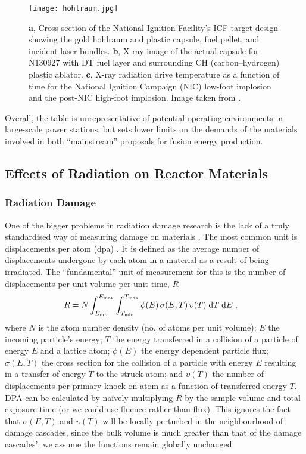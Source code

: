 \begin{figure}[t]
	\centering
	\texttt{[image: hohlraum.jpg]}
	\caption[Hohlraum design for indirect drive in Inertial Confinement Fusion.]{\textbf{a}, Cross section of the National Ignition Facility's ICF target design showing the gold hohlraum and plastic capsule, fuel pellet, and incident laser bundles. \textbf{b}, X-ray image of the actual capsule for N130927 with DT fuel layer and surrounding CH (carbon–hydrogen) plastic ablator. \textbf{c}, X-ray radiation drive temperature as a function of time for the National Ignition Campaign (NIC) low-foot implosion and the post-NIC high-foot implosion. Image taken from \cite{hohlraum}.}
	\label{fig:hohlraum}
\end{figure}

Overall, the table is unrepresentative of potential operating environments in large-scale power stations, but sets lower limits on the demands of the materials involved in both ``mainstream'' proposals for fusion energy production.

\subsection{Effects of Radiation on Reactor Materials}
\label{ss:rad_effect_mat}
\subsubsection{Radiation Damage}
\label{sss:rad_damage}
One of the bigger problems in radiation damage research is the lack of a truly standardised way of measuring damage on materials \cite{srimisbad}. The most common unit is displacements per atom (dpa) \cite{dpa}. It is defined as the average number of displacements undergone by each atom in a material as a result of being irradiated. The ``fundamental'' unit of measurement for this is the number of displacements per unit volume per unit time, $R$
\begin{align}
	R & = N\int _{E_{\textrm{min}}}^{E_{\textrm{max}}}\int _{T_{\textrm{min}}}^{T_{\textrm{max}}}\phi (E)\,\sigma (E,T)\,\upsilon (T)\;\textrm{d}T\;\textrm{d}E\;,
\end{align}
where $ N $ is the atom number density (no. of atoms per unit volume); $ E $ the incoming particle's energy; $ T $ the energy transferred in a collision of a particle of energy $E$ and a lattice atom; $ \phi(E) $ the energy dependent particle flux; $ \sigma(E,T) $ the cross section for the collision of a particle with energy $ E $ resulting in a transfer of energy $ T $ to the struck atom; and $ \upsilon(T) $ the number of displacements per primary knock on atom as a function of transferred energy $ T $. DPA can be calculated by na\"{i}vely multiplying $ R $ by the sample volume and total exposure time (or we could use fluence rather than flux). This ignores the fact that $\sigma (E,T)$ and $\upsilon (T)$ will be locally perturbed in the neighbourhood of damage cascades, since the bulk volume is much greater than that of the damage cascades', we assume the functions remain globally unchanged.

